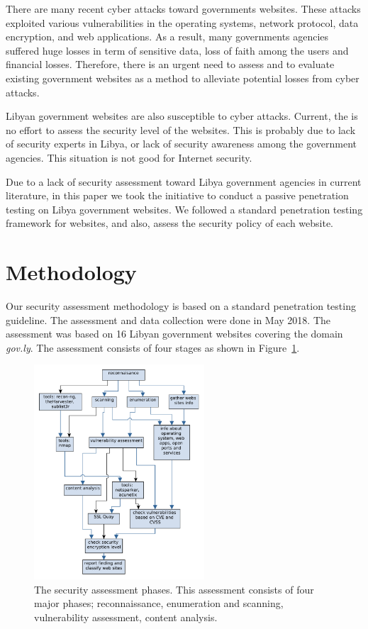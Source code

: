 \documentclass[conference]{IEEEtran}
\begin{document}
There are many recent cyber attacks toward governments
websites\cite{zhao2010opportunities}. These attacks exploited various
vulnerabilities in the operating systems, network protocol, data
encryption, and web applications. As a result, many governments agencies suffered huge losses
in term of sensitive data, loss of faith among the users and financial losses\cite{tehrani2013cyber}.
Therefore, there is an urgent need to assess and to evaluate existing government
websites as a method to alleviate potential losses from cyber
attacks\cite{al2015security}.

Libyan government websites are also susceptible to cyber
attacks\cite{ihmouda2013penetration}. Current, the is no effort
to assess the security level of the websites. This is probably
due to lack of security experts in Libya, or lack of security
awareness among the government agencies. This situation is not
good for Internet security\cite{yusof2011cyber}.

Due to a lack of security assessment toward Libya government
agencies in current literature, in this paper we took the
initiative to conduct a passive penetration testing on Libya
government websites. We followed a standard penetration testing
framework for
websites\cite{srinivasan2017web,antunes2014penetration}, and
also, assess the security policy of each website.

\section{Methodology}

Our security assessment methodology is based on  
a standard penetration testing guideline\cite{weidman2014penetration}\cite{felderer2016security}.
The assessment and data collection were done
in May 2018. The assessment was based on 16 Libyan
government
websites covering the domain \emph{gov.ly}. The assessment consists of
four
stages as shown in Figure~\ref{fig:steps}.


\begin{figure}[htbp]
\centerline{\includegraphics[width=2.5in]{steps.pdf}}
\caption{The security assessment phases. This assessment
consists of
 four major phases; reconnaissance, enumeration and scanning,
  vulnerability assessment, content analysis.}
\label{fig:steps}
\end{figure}
\end{document}
